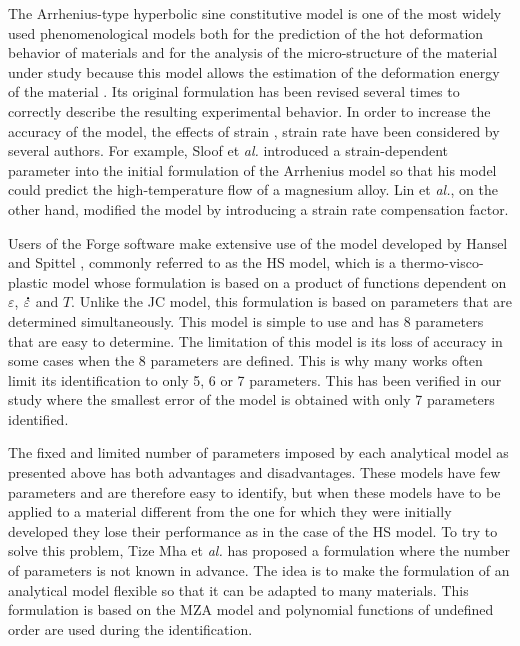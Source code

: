 \documentclass[twoside,english,1p,final,sort&compress]{elsarticle}
\makeatletter
\theoremstyle{plain}
\DeclareRobustCommand{\mdot}[1]{\accentset{\mbox{\bfseries .}}{#1}}
\DeclareRobustCommand{\eal}{et \emph{al.}\@\xspace}
\makeatother
\begin{document}
The Arrhenius-type hyperbolic sine constitutive model is one of the most widely used phenomenological models both for the prediction of the hot deformation behavior of materials and for the analysis of the micro-structure of the material under study because this model allows the estimation of the deformation energy of the material \cite{Jonas-1969, Mostafaei-2012, Zhang-2012}.
Its original formulation has been revised several times to correctly describe the resulting experimental behavior.
In order to increase the accuracy of the model, the effects of strain \cite{Slooff-2007, Li-2012, Xu-2013}, strain rate \cite{Lin-2008-C, Mandal-2009} have been considered by several authors.
For example, Sloof \eal \cite{Slooff-2007} introduced a strain-dependent parameter into the initial formulation of the Arrhenius model so that his model could predict the high-temperature flow of a magnesium alloy.
Lin \eal \cite{Lin-2008-C}, on the other hand, modified the model by introducing a strain rate compensation factor.

Users of the Forge software make extensive use of the model developed by Hansel and Spittel \cite{Hensel-1978}, commonly referred to as the HS model, which is a thermo-visco-plastic model whose formulation is based on a product of functions dependent on $\varepsilon$, $\mdot\varepsilon$ and $T$.
Unlike the JC model, this formulation is based on parameters that are determined simultaneously.
This model is simple to use and has 8 parameters that are easy to determine.
The limitation of this model is its loss of accuracy in some cases when the 8 parameters are defined.
This is why many works often limit its identification to only 5, 6 or 7 parameters.
This has been verified in our study where the smallest error of the model is obtained with only 7 parameters identified.

The fixed and limited number of parameters imposed by each analytical model as presented above has both advantages and disadvantages.
These models have few parameters and are therefore easy to identify, but when these models have to be applied to a material different from the one for which they were initially developed they lose their performance as in the case of the HS model.
To try to solve this problem, Tize Mha \eal \cite{TizeMha-2022} has proposed a formulation where the number of parameters is not known in advance.
The idea is to make the formulation of an analytical model flexible so that it can be adapted to many materials.
This formulation is based on the MZA model and polynomial functions of undefined order are used during the identification.
\end{document}
